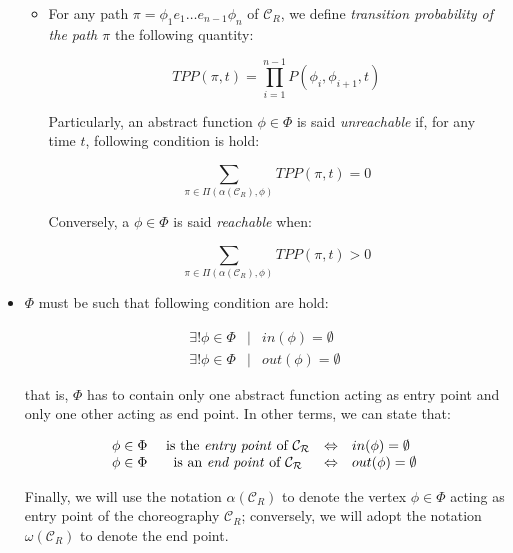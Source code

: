 \documentclass[12pt,a4paper]{report}
\begin{document}
\begin{itemize}
\begin{itemize}
		\item For any path $\pi = \phi_1 e_1 \ldots e_{n-1} \phi_n$ of $\mathcal{C}_R$, we define \textit{transition probability of the path $\pi$} the following quantity:
		
		\begin{equation}
			TPP(\pi, t) = \prod_{i = 1}^{n-1} P\left(\phi_i, \phi_{i+1}, t \right)
		\end{equation}
	
		Particularly, an abstract function $\phi \in \Phi$ is said \textit{unreachable} if, for any time $t$, following condition is hold:
	
		\begin{equation}\label{cond3}
			\displaystyle \sum_{\pi \in \Pi(\alpha(\mathcal{C}_R), \phi)} TPP(\pi, t) = 0
		\end{equation}
	
		Conversely, a $\phi \in \Phi$ is said \textit{reachable} when:

		\begin{equation}\label{cond3}
			\displaystyle \sum_{\pi \in \Pi(\alpha(\mathcal{C}_R), \phi)} TPP(\pi, t) > 0
		\end{equation}
		
	\end{itemize}

	\item $\Phi$ must be such that following condition are hold:
	
	\begin{eqnarray}
		\exists !  \phi \in \Phi &\mid & in(\phi) = \emptyset \label{cond1} \\
		\exists !  \phi \in \Phi & \mid & out(\phi) = \emptyset \label{cond2}
	\end{eqnarray}
	
	that is, $\Phi$ has to contain only one abstract function acting as entry point and only one other acting as end point.	In other terms, we can state that:
	
	\begin{equation}
		\begin{array}{lcll}
			\phi \in \Phi & \text{ is the \textit{entry point} of } \mathcal{C_R} & \Leftrightarrow & in(\phi) = \emptyset \\
			\phi \in \Phi & \text{ is an \textit{end point} of } \mathcal{C_R} & \Leftrightarrow & out(\phi) = \emptyset
		\end{array}
	\end{equation}
	
	Finally, we will use the notation $\alpha(\mathcal{C}_R)$ to denote the vertex $\phi \in \Phi$ acting as entry point of the choreography $\mathcal{C}_R$; conversely, we will adopt the notation $\omega(\mathcal{C}_R)$ to denote the end point.
	

\end{itemize}
\end{document}
